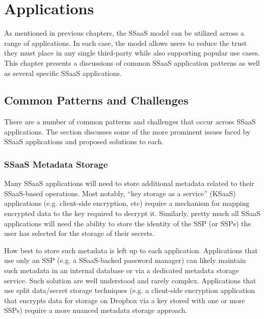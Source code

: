 \chapter{Applications}
\label{chap:apps}

As mentioned in previous chapters, the SSaaS model can be utilized
across a range of applications. In each case, the model allows users
to reduce the trust they must place in any single third-party while
also supporting popular use cases. This chapter presents a discussions
of common SSaaS application patterns as well as several specific SSaaS
applications.

\section{Common Patterns and Challenges}

There are a number of common patterns and challenges that occur across
SSaaS applications. The section discusses some of the more prominent
issues faced by SSaaS applications and proposed solutions to each.

\subsection{SSaaS Metadata Storage}

Many SSaaS applications will need to store additional metadata related
to their SSaaS-based operations. Most notably, ``key storage as a
service'' (KSaaS) applications (e.g. client-side encryption, etc)
require a mechanism for mapping encrypted data to the key required to
decrypt it. Similarly, pretty much all SSaaS applications will need
the ability to store the identity of the SSP (or SSPs) the user has
selected for the storage of their secrets.

How best to store such metadata is left up to each application.
Applications that use only an SSP (e.g. a SSaaS-backed password
manager) can likely maintain such metadata in an internal database or
via a dedicated metadata storage service. Such solution are well
understood and rarely complex. Applications that use split data/secret
storage techniques (e.g. a client-side encryption application that
encrypts data for storage on Dropbox via a key stored with one or more
SSPs) require a more nuanced metadata storage approach.

